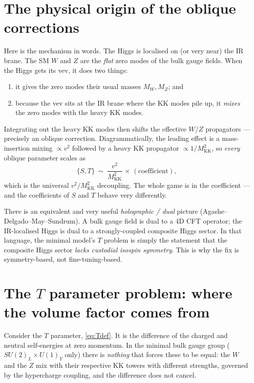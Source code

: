 \documentclass[11pt]{article}
\newcommand{\MKK}{M_{\mathrm{KK}}}
\newcommand{\vev}{v}
\newcommand{\SUL}{SU(2)_L}
\theoremstyle{definition}
\begin{document}
\section{The physical origin of the oblique corrections}
\label{sec:rsorigin}

Here is the mechanism in words. The Higgs is localised on (or very near) the IR
brane. The SM $W$ and $Z$ are the \emph{flat} zero modes of the bulk gauge
fields. When the Higgs gets its vev, it does two things:
\begin{enumerate}[leftmargin=1.6em]
\item it gives the zero modes their usual masses $M_W, M_Z$; and
\item because the vev sits at the IR brane where the KK modes pile up, it
\emph{mixes} the zero modes with the heavy KK modes.
\end{enumerate}
Integrating out the heavy KK modes then shifts the effective $W/Z$ propagators
--- precisely an oblique correction. Diagrammatically, the leading effect is a
mass-insertion mixing $\propto \vev^2$ followed by a heavy KK propagator
$\propto 1/\MKK^2$, so \emph{every} oblique parameter scales as
\begin{equation}
\{S, T\}\ \sim\ \frac{\vev^2}{\MKK^2}\,\times\,(\text{coefficient}),
\label{eq:scaling}
\end{equation}
which is the universal $\vev^2/\MKK^2$ decoupling. The whole game is in the
coefficient --- and the coefficients of $S$ and $T$ behave very differently.

There is an equivalent and very useful \emph{holographic / dual} picture
(Agashe--Delgado--May--Sundrum). A bulk gauge field is dual to a 4D CFT operator;
the IR-localised Higgs is dual to a strongly-coupled composite Higgs sector. In
that language, the minimal model's $T$ problem is simply the statement that the
composite Higgs sector \emph{lacks custodial isospin symmetry}. This is why the
fix is symmetry-based, not fine-tuning-based.

\section{The $T$ parameter problem: where the volume factor comes from}
\label{sec:Tproblem}

Consider the $T$ parameter, \eqref{eq:Tdef}. It is the difference of the charged
and neutral self-energies at zero momentum. In the minimal bulk gauge group
($\SUL\times U(1)_Y$ only) there is \emph{nothing} that forces these to be equal:
the $W$ and the $Z$ mix with their respective KK towers with different strengths,
governed by the hypercharge coupling, and the difference does not cancel.
\end{document}
